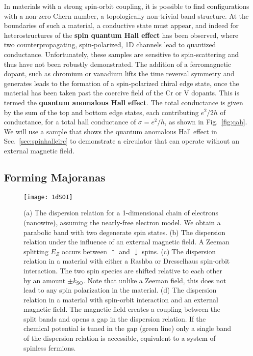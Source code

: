 In materials with a strong spin-orbit coupling, it is possible to find configurations with a non-zero Chern number, a topologically non-trivial band structure.
At the boundaries of such a material, a conductive state must appear\cite{PhysRevLett.93.156804,PhysRevLett.92.126603}, and indeed for heterostructures of 
the \textbf{spin quantum Hall effect} has been observed\cite{Konig766}, where two counterpropagating, spin-polarized, 1D channels lead to quantized conductance. Unfortunately, these
samples are sensitive to spin-scattering and thus have not been robustly demonstrated. The addition of a ferromagnetic dopant, such as chromium or vanadium lifts the
time reversal symmetry and generates leads to the formation of a spin-polarized chiral edge state, once the material has been taken past the coercive field of the
Cr or V dopants. This is termed the \textbf{quantum anomalous Hall effect}. The total conductance is given by the sum of the top and bottom edge states,
each contributing $e^2/2h$ of conductance, for a total hall conductance of $\sigma = e^2/h$, as shown in Fig.~\ref{fig:qah}. We will use a sample that shows the
quantum anomalous Hall effect in Sec.~\ref{sec:spinhallcirc} to demonstrate a circulator that can operate without an external magnetic field.

\subsection{Forming Majoranas}
\label{sec:makemajo}

\begin{figure}
  \texttt{[image: 1dSOI]}
  \caption[Spin-orbit interaction in a nanowire with a magnetic field]
  {\label{fig:1dsoi}(a) The dispersion relation for a 1-dimensional chain of electrons (nanowire), assuming the nearly-free electron model. We obtain a parabolic band with two degenerate spin states. (b) The dispersion relation under the influence of an external magnetic field. A Zeeman splitting $E_Z$ occurs
  between $\uparrow$ and $\downarrow$ spins. (c) The dispersion relation in a material with either a Rashba or Dresselhaus spin-orbit interaction. The two spin species are shifted relative to each other by an amount $\pm k_\textrm{SO}$. Note that unlike a Zeeman field, this does not lead to any spin polarization in the material. (d) The dispersion relation in a material with spin-orbit interaction and an external magnetic field. The magnetic field creates a coupling between the split bands and opens a gap in the dispersion relation. If the chemical potential is tuned in the gap (green line) only a single band of the
  dispersion relation is accessible, equivalent to a system of spinless fermions.}
\end{figure}

